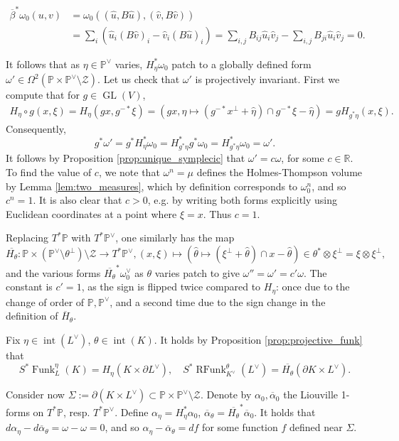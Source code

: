 \documentclass[reqno,10pt]{amsart}
\newcommand{\blue}{}
\newcounter{mp}
\DeclareMathOperator{\inter}{int}
\DeclareMathOperator{\GL}{GL}
\DeclareMathOperator{\Funk}{Funk}
\DeclareMathOperator{\RFunk}{RFunk}
\newcommand{\R}{\mathbb{R}}
\newcommand{\PP}{\mathbb{P}}
\begin{document}
\begin{align*}\overline\beta^*\omega_0(u,v)&=\omega_0((\hat u, B\hat u), (\hat v, B\hat v))\\&=\sum_i( \hat u_i (B\hat v)_i- \hat v_i (B\hat u)_i)=\sum_{i,j}B_{ij}\hat u_i\hat v_j-\sum_{i,j}B_{ji}\hat u_i\hat v_j=0.\end{align*}

It follows that as $\eta\in\mathbb P^\vee$ varies, $H_\eta^*\omega_0$ patch to a globally defined form $\omega'\in \Omega^2(\mathbb P\times\mathbb P^\vee\setminus \mathcal Z)$. Let us check that $\omega'$ is projectively invariant. First we compute
 that for $g\in \GL(V)$, \begin{align*} H_\eta\circ g(x,\xi)=H_\eta(gx,g^{-*}\xi)=(gx, \hat\eta\mapsto (g^{-*}x^\perp+\hat \eta)\cap g^{-*}\xi-\hat\eta)=gH_{g^*\eta}(x,\xi).\end{align*}
Consequently, $$g^*\omega'=g^*H_\eta^*\omega_0= H_{g^*\eta}^* g^*\omega_0= H_{g^*\eta}^*\omega_0=\omega'.$$
It follows by Proposition \ref{prop:unique_symplecic} that $\omega'=c\omega$, for some $c\in\R$. 
{\blue To find the value of $c$, we note that $\omega^n=\mu$ defines the Holmes-Thompson volume by Lemma \ref{lem:two_measures}, which by definition corresponds to $\omega_0^n$, and so $c^n=1$. It is also clear that $c>0$, e.g. by writing both forms explicitly using Euclidean coordinates at a point where $\xi=x$. Thus $c=1$.}

Replacing $T^*\mathbb P$ with $T^*\mathbb P^\vee$, one similarly has the map $$\overline{H_\theta}:\PP\times (\mathbb P^\vee\setminus \theta^\perp)\setminus \mathcal Z\to T^*\mathbb P^\vee, (x,\xi)\mapsto \left(\hat\theta \mapsto (\xi^\perp+\hat \theta)\cap x -\hat\theta\right) \in \theta^*\otimes \xi^\perp=\xi\otimes\xi^\perp, $$ and the various forms $\overline{H_\theta}^*\omega_0^\vee$ as $\theta$ varies patch to give $\omega''=\omega'=c'\omega$. The constant is $c'=1$, as the sign is flipped twice compared to $H_\eta$: once due to the change of order of $\PP, \PP^\vee$, and a second time due to the sign change in the definition of $\overline H_\theta$.

Fix $\eta\in \inter(L^\vee)$, $\theta\in \inter(K)$. It holds by Proposition \ref{prop:projective_funk} that $$S^*\Funk^\eta_L(K)=H_\eta(K\times\partial L^\vee),\quad S^*\RFunk^\theta_{K^\vee}(L^\vee)=\overline{H_\theta}(\partial K\times L^\vee).$$

Consider now $\Sigma:=\partial (K\times L^\vee)\subset\PP\times\PP^\vee\setminus\mathcal Z$. Denote by $\alpha_0, \overline\alpha_0$ the Liouville 1-forms on $T^*\mathbb P$, resp. $T^*\PP^\vee$. Define $\alpha_\eta=H_\eta^*\alpha_0$, $\overline\alpha_\theta=\overline{H_\theta}^*\overline\alpha_0$. It holds that $d\alpha_\eta-d\overline \alpha_\theta=\omega-\omega=0$, and so $\alpha_\eta-\overline \alpha_\theta=df$ for some function $f$ defined near $\Sigma$. 
\end{document}
